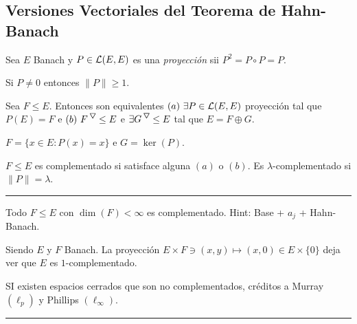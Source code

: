 \subsection*{Versiones Vectoriales del Teorema de Hahn-Banach}

\begin{definition}
    Sea \(E\) Banach y \(P\in \mathcal{L}(E,E)\) es una \emph{proyección} sii \(P^2 = P \circ P = P \). 
\end{definition}
\begin{note}
    Si \(P\neq 0\) entonces \(\|P\|\geq 1 \). 
\end{note}
\begin{proposition}
    Sea \(F\leq E\). Entonces son equivalentes \((a)\ \exists P\in \mathcal{L}(E,E)\) proyección tal que \(P(E) = F   \) e \((b) \ F^\ce \leq E \) e \(\exists G^\ce \leq E  \) tal que \(E = F\oplus G\). 
\end{proposition}
\begin{note}
    \(F = \{x\in E : P(x) = x\}\) e \(G = \ker(P)\). 
\end{note}
\begin{definition}
    \(F\leq E \) es complementado si satisface alguna \((a)\) o \((b)\). Es \(\lambda\)-complementado si \(\|P\| = \lambda\). 
\end{definition}

\E

\hrule 
\begin{example}
    Todo \(F\leq E\) con \(\dim (F)<\infty \) es complementado. Hint: Base + $a_j$ + Hahn-Banach.   
\end{example}
\begin{example}
    Siendo \(E\) y \(F\) Banach. La proyección \(E\times F \ni (x,y)\mapsto (x,0) \in E\times \{0\}\) deja ver que \(E\) es $1$-complementado. 
\end{example}
\begin{example}
    SI existen espacios cerrados que son no complementados, créditos a Murray \((\ell_p)\) y Phillips \((\ell_\infty)\). 
\end{example}
\hrule 

\E

